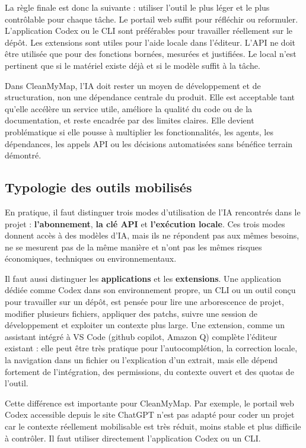 \documentclass[
  10pt,
  a4paper,
  DIV=11,
  numbers=noendperiod,
  oneside]{scrreprt}
\let\oldtextbf\textbf
\renewcommand{\textbf}[1]{\oldtextbf{\textcolor{cmmnavy}{#1}}}
\begin{document}
La règle finale est donc la suivante : utiliser l'outil le plus léger et
le plus contrôlable pour chaque tâche. Le portail web suffit pour
réfléchir ou reformuler. L'application Codex ou le CLI sont préférables
pour travailler réellement sur le dépôt. Les extensions sont utiles pour
l'aide locale dans l'éditeur. L'API ne doit être utilisée que pour des
fonctions bornées, mesurées et justifiées. Le local n'est pertinent que
si le matériel existe déjà et si le modèle suffit à la tâche.

Dans CleanMyMap, l'IA doit rester un moyen de développement et de
structuration, non une dépendance centrale du produit. Elle est
acceptable tant qu'elle accélère un service utile, améliore la qualité
du code ou de la documentation, et reste encadrée par des limites
claires. Elle devient problématique si elle pousse à multiplier les
fonctionnalités, les agents, les dépendances, les appels API ou les
décisions automatisées sans bénéfice terrain démontré.

\subsection{Typologie des outils
mobilisés}\label{typologie-des-outils-mobilisuxe9s}

En pratique, il faut distinguer trois modes d'utilisation de l'IA
rencontrés dans le projet : \textbf{l'abonnement}, \textbf{la clé API}
et \textbf{l'exécution locale}. Ces trois modes donnent accès à des
modèles d'IA, mais ils ne répondent pas aux mêmes besoins, ne se
mesurent pas de la même manière et n'ont pas les mêmes risques
économiques, techniques ou environnementaux.

Il faut aussi distinguer les \textbf{applications} et les
\textbf{extensions}. Une application dédiée comme Codex dans son
environnement propre, un CLI ou un outil conçu pour travailler sur un
dépôt, est pensée pour lire une arborescence de projet, modifier
plusieurs fichiers, appliquer des patchs, suivre une session de
développement et exploiter un contexte plus large. Une extension, comme
un assistant intégré à VS Code (github copilot, Amazon Q) complète
l'éditeur existant : elle peut être très pratique pour l'autocomplétion,
la correction locale, la navigation dans un fichier ou l'explication
d'un extrait, mais elle dépend fortement de l'intégration, des
permissions, du contexte ouvert et des quotas de l'outil.

Cette différence est importante pour CleanMyMap. Par exemple, le portail
web Codex accessible depuis le site ChatGPT n'est pas adapté pour coder
un projet car le contexte réellement mobilisable est très réduit, moins
stable et plus difficile à contrôler. Il faut utiliser directement
l'application Codex ou un CLI.
\end{document}
